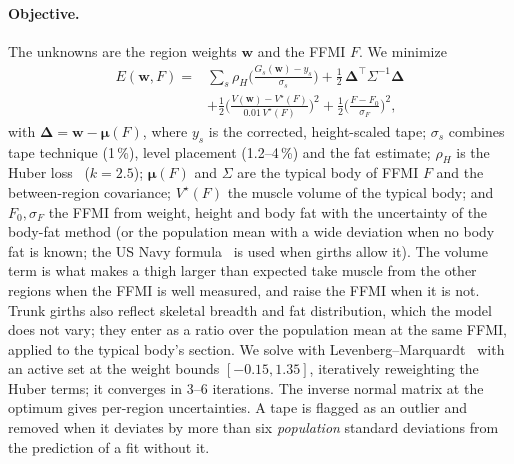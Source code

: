 \documentclass[10pt,twocolumn]{article}
\newcommand{\vect}[1]{\mathbf{#1}}
\begin{document}
\paragraph{Objective.}
The unknowns are the region weights $\vect w$ and the FFMI $F$. We minimize
\begin{equation}
\begin{split}
E(\vect w,F)={}&\sum_s \rho_H\!\Big(\frac{G_s(\vect w)-y_s}{\sigma_s}\Big)
+\tfrac12\,\boldsymbol\Delta^{\!\top}\Sigma^{-1}\boldsymbol\Delta\\
&+\tfrac12\Big(\frac{V(\vect w)-V^\star(F)}{0.01\,V^\star(F)}\Big)^{2}
+\tfrac12\Big(\frac{F-F_0}{\sigma_F}\Big)^{2},
\end{split}
\end{equation}
with $\boldsymbol\Delta=\vect w-\boldsymbol\mu(F)$, where $y_s$ is the corrected, height-scaled tape; $\sigma_s$ combines tape technique (1\,\%), level
placement (1.2--4\,\%) and the fat estimate; $\rho_H$ is the Huber loss~\cite{huber1964robust}
($k=2.5$); $\boldsymbol\mu(F)$ and $\Sigma$ are the typical body of FFMI $F$ and the between-region
covariance; $V^\star(F)$ the muscle volume of the typical body; and $F_0,\sigma_F$ the FFMI from weight,
height and body fat with the uncertainty of the body-fat method (or the population mean with a wide
deviation when no body fat is known; the US Navy formula~\cite{hodgdon1984navy} is used when girths
allow it). The volume term is what makes a thigh larger than expected take muscle from the other
regions when the FFMI is well measured, and raise the FFMI when it is not. Trunk girths also reflect
skeletal breadth and fat distribution, which the model does not vary; they enter as a ratio over the
population mean at the same FFMI, applied to the typical body's section. We solve with
Levenberg--Marquardt~\cite{levenberg1944,marquardt1963} with an active set at the weight bounds
$[-0.15,1.35]$, iteratively reweighting the Huber terms; it converges in 3--6 iterations. The inverse
normal matrix at the optimum gives per-region uncertainties. A tape is flagged as an outlier and
removed when it deviates by more than six \emph{population} standard deviations from the prediction of
a fit without it.
\end{document}
